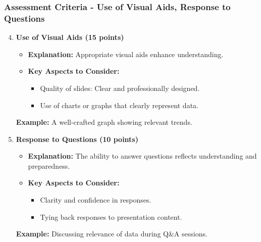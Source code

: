 \documentclass[aspectratio=169]{beamer}
\begin{document}
\begin{frame}[fragile]
    \frametitle{Assessment Criteria - Use of Visual Aids, Response to Questions}
    \begin{enumerate}
        \setcounter{enumi}{3} %
        \item \textbf{Use of Visual Aids (15 points)}
        \begin{itemize}
            \item \textbf{Explanation:} Appropriate visual aids enhance understanding.
            \item \textbf{Key Aspects to Consider:}
            \begin{itemize}
                \item Quality of slides: Clear and professionally designed.
                \item Use of charts or graphs that clearly represent data.
            \end{itemize}
        \end{itemize}
        
        \textbf{Example:} A well-crafted graph showing relevant trends.
        
        \item \textbf{Response to Questions (10 points)}
        \begin{itemize}
            \item \textbf{Explanation:} The ability to answer questions reflects understanding and preparedness.
            \item \textbf{Key Aspects to Consider:}
            \begin{itemize}
                \item Clarity and confidence in responses.
                \item Tying back responses to presentation content.
            \end{itemize}
        \end{itemize}

        \textbf{Example:} Discussing relevance of data during Q\&A sessions.
    \end{enumerate}
\end{frame}
\end{document}
